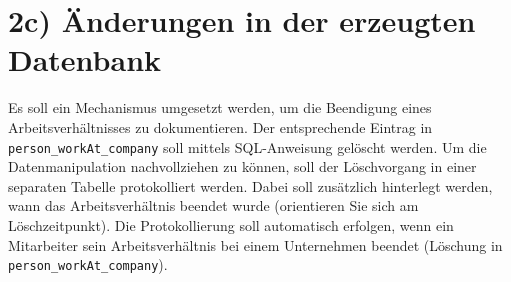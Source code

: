 \section*{2c) Änderungen in der erzeugten Datenbank}
Es soll ein Mechanismus umgesetzt werden, um die Beendigung eines Arbeitsverhältnisses zu dokumentieren.
Der entsprechende Eintrag in \texttt{person\_workAt\_company} soll mittels SQL-Anweisung gelöscht werden.
Um die Datenmanipulation nachvollziehen zu können, soll der Löschvorgang in einer separaten Tabelle protokolliert werden.
Dabei soll zusätzlich hinterlegt werden, wann das Arbeitsverhältnis beendet wurde (orientieren Sie sich am Löschzeitpunkt).
Die Protokollierung soll automatisch erfolgen, wenn ein Mitarbeiter sein Arbeitsverhältnis bei einem Unternehmen beendet (Löschung in \texttt{person\_workAt\_company}).


